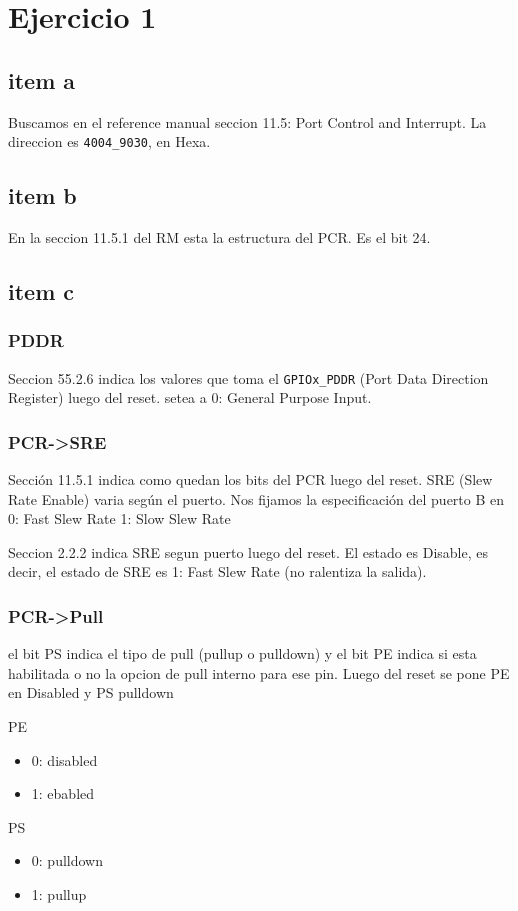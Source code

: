 \documentclass[10pt,a4paper]{article}
\author{Lisandro Alvarez}
\begin{document}
\section{Ejercicio 1}
\subsection{item a}
Buscamos en el reference manual seccion 11.5: Port Control and Interrupt. La direccion es \texttt{4004\_9030}, en Hexa.
\subsection{item b}
En la seccion 11.5.1 del RM esta la estructura del PCR. Es el bit 24.
\subsection{item c}
\subsubsection{PDDR}
Seccion 55.2.6 indica los valores que toma el  \texttt{GPIOx\_PDDR} (Port Data Direction Register) luego del reset. setea a 0: General Purpose Input.

\subsubsection{PCR->SRE}
Sección 11.5.1 indica como quedan los bits del PCR luego del reset. SRE (Slew Rate Enable) varia según el puerto. Nos fijamos la especificación del puerto B en 
0: Fast Slew Rate
1: Slow Slew Rate

Seccion 2.2.2 indica SRE segun puerto luego del reset. El estado es Disable, es decir, el estado de SRE es 1: Fast Slew Rate (no ralentiza la salida).

\subsubsection{PCR->Pull}
el bit PS indica el tipo de pull (pullup o pulldown) y el bit PE indica si esta habilitada o no la opcion de pull interno para ese pin. Luego del reset se pone PE en Disabled y PS pulldown

PE
\begin{itemize}
\item 0: disabled
\item 1: ebabled
\end{itemize}

PS
\begin{itemize}
\item 0: pulldown
\item 1: pullup
\end{itemize}
\end{document}
